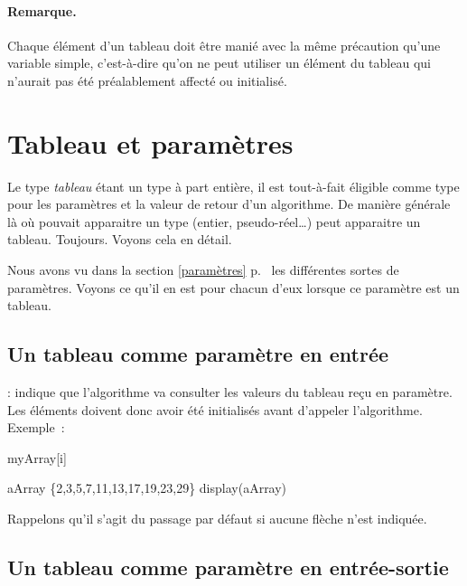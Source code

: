 	\paragraph{Remarque.} Chaque élément d’un tableau doit être manié avec la
	même précaution qu’une variable simple, c’est-à-dire qu’on ne peut utiliser
	un élément du tableau qui n’aurait pas été préalablement affecté ou
	initialisé.

		

	\section{Tableau et paramètres}
	
		Le type \emph{tableau} étant un type à part entière, il est tout-à-fait
		éligible comme type pour les paramètres et la valeur de retour d’un
		algorithme.  De manière générale là où pouvait apparaitre un type
		(entier, pseudo-réel…) peut apparaitre un tableau.  Toujours.  Voyons
		cela en détail.  

		Nous avons vu dans la section \ref{paramètres} p.~\pageref{paramètres}
		les différentes sortes de paramètres. Voyons ce qu'il en est pour
		chacun d'eux lorsque ce paramètre est un tableau. 


		\subsection{Un tableau comme paramètre en entrée}
				
		\In : indique que l’algorithme va consulter les valeurs du tableau reçu
		en paramètre.  Les éléments doivent donc avoir été initialisés avant
		d’appeler l’algorithme. Exemple~:
			
		\begin{pseudocode}
					\Write myArray[i]
				\EndFor
			\EndAlgo 

			\Empty
			\Let aArray \Gets \{2,3,5,7,11,13,17,19,23,29\}
			\Stmt display(aArray)
		\end{pseudocode}
	
		Rappelons qu’il s’agit du passage par défaut si aucune flèche n’est
		indiquée.
				

		\subsection{Un tableau comme paramètre en entrée-sortie}

